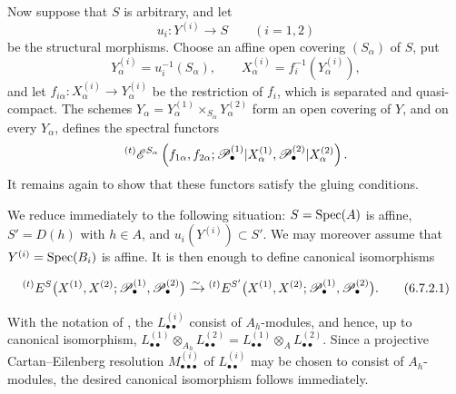 \begin{env}[6.7.2]
\label{III.6.7.2}
Now suppose that $S$ is arbitrary, and let
\[
  u_i:Y^{(i)}\longrightarrow S
  \qquad(i=1,2)
\]
be the structural morphisms.  Choose an affine open covering
$(S_\alpha)$ of $S$, put
\[
  Y_\alpha^{(i)}=u_i^{-1}(S_\alpha),
  \qquad
  X_\alpha^{(i)}=f_i^{-1}(Y_\alpha^{(i)}),
\]
and let $f_{i\alpha}:X_\alpha^{(i)}\longrightarrow Y_\alpha^{(i)}$
be the restriction of $f_i$, which is separated and
quasi-compact.  The schemes $Y_\alpha
=
Y_\alpha^{(1)}
\times_{S_\alpha}Y_\alpha^{(2)}$
form an open covering of $Y$, and on every $Y_\alpha$,
 defines the spectral functors
\[
  {}^{(t)}\mathscr{E}^{S_\alpha}
  \left(
    f_{1\alpha},f_{2\alpha};
    \mathscr{P}_\bullet^{(1)}|X_\alpha^{(1)},
    \mathscr{P}_\bullet^{(2)}|X_\alpha^{(2)}
  \right).
\]
It remains again to show that these functors satisfy the gluing
conditions.

We reduce immediately to the following situation:
$S=\operatorname{Spec}(A)$ is affine,
$S'=D(h)$ with $h\in A$, and
$u_i(Y^{(i)})\subset S'$.  We may moreover assume that
$Y^{(i)}=\operatorname{Spec}(B_i)$ is affine.  It is then enough to define
canonical isomorphisms
\begin{env}[6.7.2.1]
\label{III.6.7.2.1}
\[
  {}^{(t)}E^S
  \bigl(
    X^{(1)},X^{(2)};
    \mathscr{P}_\bullet^{(1)},\mathscr{P}_\bullet^{(2)}
  \bigr)
  \xrightarrow{\sim}
  {}^{(t)}E^{S'}
  \bigl(
    X^{(1)},X^{(2)};
    \mathscr{P}_\bullet^{(1)},\mathscr{P}_\bullet^{(2)}
  \bigr).
  \tag{6.7.2.1}\label{III.6.7.2.1.eq}
\]
\end{env}
With the notation of , the
$L_{\bullet\bullet}^{(i)}$ consist of $A_h$-modules, and hence,
up to canonical isomorphism, $L_{\bullet\bullet}^{(1)}
\otimes_{A_h}L_{\bullet\bullet}^{(2)}
=
L_{\bullet\bullet}^{(1)}
\otimes_A L_{\bullet\bullet}^{(2)}$.
Since a projective Cartan--Eilenberg resolution
$M_{\bullet\bullet\bullet}^{(i)}$ of $L_{\bullet\bullet}^{(i)}$ may be
chosen to consist of $A_h$-modules, the desired canonical
isomorphism follows immediately.
\end{env}

